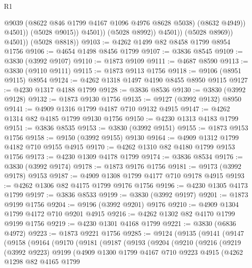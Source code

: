 \begin{lexlean}{R1}
\begin{coremodule}
                              @9039
                              (@8622 @846 @1799 @4167 @1096 @4976 @8628 @5038)
                              (@8632 @4949))
                            @4501))
                        (@5028 @9015))
                      @4501))
                  (@5028 @8992))
                @4501))
            (@5028 @8969))
          @4501))
      (@5028 @8818))
@9103 := @4262 @1499 @82 @8458 @1799 @8954 @1756
@9106 := @4654 @1498 @8456 @1799
@9107 := @3836 @8545
@9109 := @3830 (@3992 @9107)
@9110 := @1873 @9109
@9111 := @4687 @8590
@9113 := @3830 (@9110 @9111)
@9115 := @1873 @9113 @1756
@9118 := @9106 (@8951 @9115) @8954
@9124 := @4262 @1318 @1497 @4190 @8455 @8950 @9115
@9127 := @4230 @1317 @4188 @1799
@9128 := @3836 @8536
@9130 := @3830 (@3992 @9128)
@9132 := @1873 @9130 @1756
@9135 := @9127 (@3992 @9132) @8950
@9141 := @4909 @1316 @1799 @4187 @710 @9132 @4915
@9147 := @4262 @1314 @82 @4185 @1799 @9130 @1756
@9150 := @4230 @1313 @4183 @1799
@9151 := @3836 @8535
@9153 := @3830 (@3992 @9151)
@9155 := @1873 @9153 @1756
@9158 := @9150 (@3992 @9155) @9130
@9164 := @4909 @1312 @1799 @4182 @710 @9155 @4915
@9170 := @4262 @1310 @82 @4180 @1799 @9153 @1756
@9173 := @4230 @1309 @4178 @1799
@9174 := @3836 @8534
@9176 := @3830 (@3992 @9174)
@9178 := @1873 @9176 @1756
@9181 := @9173 (@3992 @9178) @9153
@9187 := @4909 @1308 @1799 @4177 @710 @9178 @4915
@9193 := @4262 @1306 @82 @4175 @1799 @9176 @1756
@9196 := @4230 @1305 @4173 @1799
@9197 := @3836 @8533
@9199 := @3830 (@3992 @9197)
@9201 := @1873 @9199 @1756
@9204 := @9196 (@3992 @9201) @9176
@9210 := @4909 @1304 @1799 @4172 @710 @9201 @4915
@9216 := @4262 @1302 @82 @4170 @1799 @9199 @1756
@9219 := @4230 @1301 @4168 @1799
@9221 := @3830 (@6836 @4972)
@9223 := @1873 @9221 @1756
@9285 := @9124
    (@9135
      (@9141
        (@9147
          (@9158
            (@9164
              (@9170
                (@9181
                  (@9187
                    (@9193
                      (@9204
                        (@9210
                          (@9216
                            (@9219
                              (@3992 @9223)
                              @9199
                              (@4909
                                @1300
                                @1799
                                @4167
                                @710
                                @9223
                                @4915
                                (@4262
                                  @1298
                                  @82
                                  @4165
                                  @1799

\end{coremodule}
\end{lexlean}
